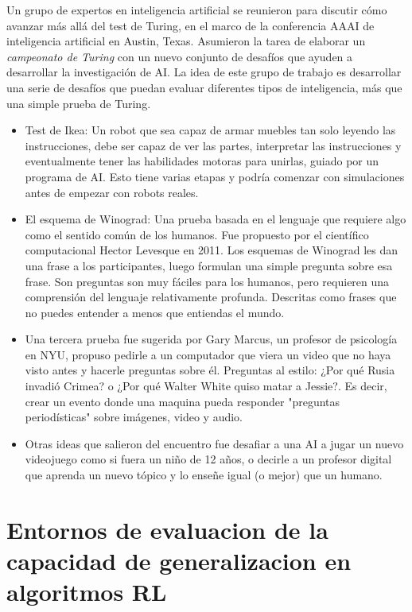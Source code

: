 Un grupo de expertos en inteligencia artificial se reunieron para discutir cómo avanzar más allá del test de Turing, en el marco de la conferencia AAAI de inteligencia artificial en Austin, Texas. Asumieron la tarea de elaborar un \textit{campeonato de Turing} con un nuevo conjunto de desafíos que ayuden a desarrollar la investigación de AI. La idea de este grupo de trabajo es desarrollar una serie de desafíos que puedan evaluar diferentes tipos de inteligencia, más que una simple prueba de Turing.
\begin{itemize}
    \item Test de Ikea: Un robot que sea capaz de armar muebles tan solo leyendo las instrucciones, debe ser capaz de ver las partes, interpretar las instrucciones y eventualmente tener las habilidades motoras para unirlas, guiado por un programa de AI. Esto tiene varias etapas y podría comenzar con simulaciones antes de empezar con robots reales.

    \item El esquema de Winograd: Una prueba basada en el lenguaje que requiere algo como el sentido común de los humanos. Fue propuesto por el científico computacional Hector Levesque en 2011. Los esquemas de Winograd les dan una frase a los participantes, luego formulan una simple pregunta sobre esa frase. Son preguntas son muy fáciles para los humanos, pero requieren una comprensión del lenguaje relativamente profunda. Descritas como frases que no puedes entender a menos que entiendas el mundo.
    
    \item Una tercera prueba fue sugerida por Gary Marcus, un profesor de psicología en NYU, propuso pedirle a un computador que viera un video que no haya visto antes y hacerle preguntas sobre él. Preguntas al estilo: ¿Por qué Rusia invadió Crimea? o ¿Por qué Walter White quiso matar a Jessie?. Es decir, crear un evento donde una maquina pueda responder "preguntas periodísticas" sobre imágenes, video y audio.

    \item Otras ideas que salieron del encuentro fue desafiar a una AI a jugar un nuevo videojuego como si fuera un niño de 12 años, o decirle a un profesor digital que aprenda un nuevo tópico y lo enseñe igual (o mejor) que un humano.
\end{itemize}


\section{Entornos de evaluacion de la capacidad de generalizacion en algoritmos RL}\label{section:state-of-the-art:evaluation-enviroments-for-generalization-on-rl-algoritms}

